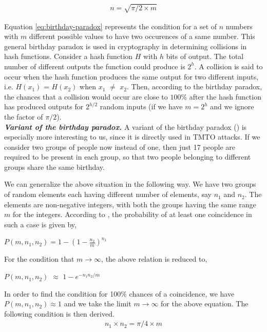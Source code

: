 \begin{align}
\label{eq:birthday-paradox} n = \sqrt{\pi/2 \times m}
\end{align}

Equation \ref{eq:birthday-paradox} represents the condition for a set of $n$ numbers with $m$ different possible values to have two occurences of a same number. This general birthday paradox is used in cryptography in determining collisions in hash functions. Consider a hash function $H$ with $h$ bits of output. The total number of different outputs the function could produce is $2^{h}$. A collision is said to occur when the hash function produces the same output for two different inputs, i.e. $H(x_1)$ = $H(x_2)$ when $x_1$ $\neq$ $x_2$. Then, according to the birthday paradox, the chances that a collision would occur are close to $100 \%$ after the hash function has produced outputs for $2^{h/2}$ random inputs (if we have $m = 2^h$ and we ignore the factor of $\pi/2$).\\

\noindent \textit{\textbf{Variant of the birthday paradox.}} A variant of the birthday paradox (\cite{GeneralizedAttack}) is especially more interesting to us, since it is directly used in TMTO attacks. If we consider two groups of people now instead of one, then just 17 people are required to be present in each group, so that two people belonging to different groups share the same birthday.  

We can generalize the above situation in the following way. We have two groups of random elements each having different number of elements, say $n_1$ and $n_2$. The elements are non-negative integers, with both the groups having the same range $m$ for the integers. According to \cite{menezes}, the probability of at least one coincidence in such a case is given by,
\begin{center}
$P(m, n_1, n_2) = 1 -(1 -\frac{n_2}{m})^{n_1}$
\end{center}

For the condition that $m \rightarrow \infty$, the above relation is reduced to,
\begin{center}
$P(m, n_1, n_2)$ $\approx$ $1 - e^{-{n_{1} n_{2}}/{m}}$
\end{center}

In order to find the condition for 100\% chances of a coincidence, we have $P(m, n_1, n_2) \approx 1$ and we take the limit $m \rightarrow \infty$ for the above equation. The following condition is then derived.
\begin{align}
\label{eq:n1-n2-m-condition} n_1 \times n_2 = \pi/4 \times m
\end{align}

